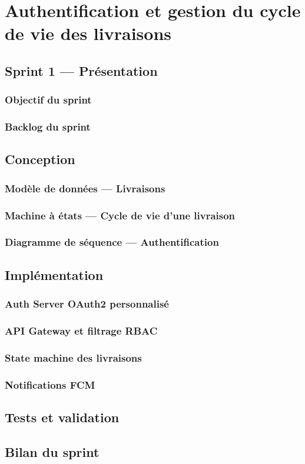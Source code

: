 \chapter{Authentification et gestion du cycle de vie des livraisons}

\section{Sprint 1 — Présentation}

\subsection{Objectif du sprint}
\subsection{Backlog du sprint}

\section{Conception}

\subsection{Modèle de données — Livraisons}
\subsection{Machine à états — Cycle de vie d'une livraison}
\subsection{Diagramme de séquence — Authentification}

\section{Implémentation}

\subsection{Auth Server OAuth2 personnalisé}

\subsection{API Gateway et filtrage RBAC}

\subsection{State machine des livraisons}

\subsection{Notifications FCM}

\section{Tests et validation}

\section*{Bilan du sprint}
